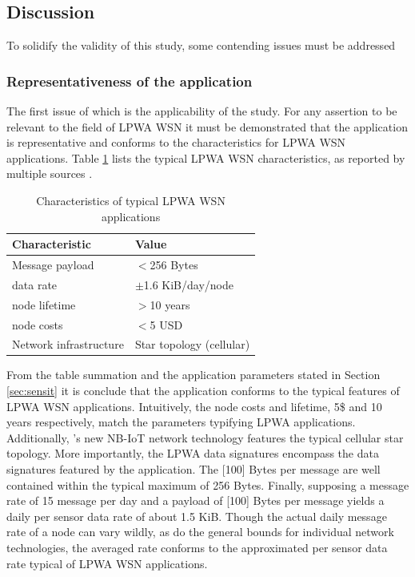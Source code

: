\subsection{Discussion}
To solidify the validity of this study, some contending issues must be addressed

\subsubsection{Representativeness of the \sensit application}
The first issue of which is the applicability of the study. For any assertion to be relevant to the field of LPWA WSN it must be demonstrated that the \sensit application is representative and conforms to the characteristics for LPWA WSN applications. Table \ref{table:LPWA-chars} lists the typical LPWA WSN characteristics, as reported by multiple sources \cite{lora_vs_sigfox_boek, lora_vs_sigfox_whitepaper, nbiot_vs_lora_vs_sigfox, lora_vs_sigfox, tmobile, nbiot}.

\begin{table}
\centering
\begin{tabular}{|l|l|}\hline
Characteristic & Value \\ \hline
Message payload & $<$256 Bytes	\\ \hline
data rate &	$\pm$1.6 KiB/day/node\footnotemark \\ \hline
node lifetime & $>$10 years \\ \hline
node costs & $<$5 USD \\ \hline
Network infrastructure & Star topology (cellular)	\\ \hline
\end{tabular}
\caption{Characteristics of typical LPWA WSN applications}
\label{table:LPWA-chars}
\end{table}


From the table summation and the application parameters stated in Section \ref{sec:sensit} it is conclude that the \sensit application conforms to the typical features of LPWA WSN applications. Intuitively, the node costs and lifetime, 5\$ and 10 years respectively, match the parameters typifying LPWA applications. Additionally, \sensit 's new NB-IoT network technology features the typical cellular star topology. More importantly, the LPWA data signatures encompass the data signatures featured by the \sensit application. The [100] Bytes per message are well contained within the typical maximum of 256 Bytes. Finally, supposing a message rate of 15 message per day and a payload of [100] Bytes per message yields a daily per sensor data rate of about 1.5 KiB. Though the actual daily message rate of a node can vary wildly, as do the general bounds for individual network technologies, the averaged rate conforms to the approximated per sensor data rate typical of LPWA WSN applications.

